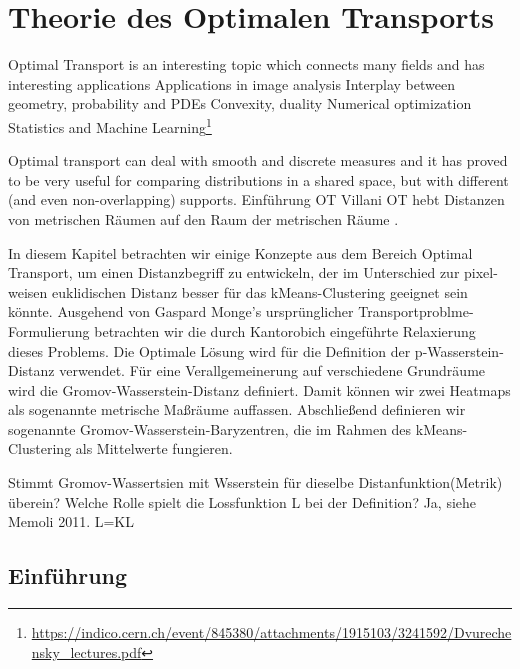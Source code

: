 \documentclass[11pt,a4paper]{article}
\numberwithin{equation}{section}
\begin{document}
	\section{Theorie des Optimalen Transports}
	
	Optimal Transport is an interesting topic which connects many fields and has
	interesting applications
	Applications in image analysis
	Interplay between geometry, probability and PDEs
	Convexity, duality
	Numerical optimization
	Statistics and Machine Learning\footnote{\url{https://indico.cern.ch/event/845380/attachments/1915103/3241592/Dvurechensky_lectures.pdf}}
	
	Optimal transport can deal with smooth and discrete measures and it has proved to be very useful
	for comparing distributions in a shared space, but with different (and even non-overlapping) supports\cite{vayer2020fused}.
	Einführung OT Villani%
	OT hebt Distanzen von metrischen Räumen auf den Raum der metrischen Räume \cite{memoli2011gromov}.
	
	In diesem Kapitel betrachten wir einige Konzepte aus dem Bereich Optimal Transport, um einen Distanzbegriff zu entwickeln, der im Unterschied zur pixel-weisen euklidischen Distanz besser für das kMeans-Clustering geeignet sein könnte.
	Ausgehend von Gaspard Monge's ursprünglicher Transportproblme-Formulierung betrachten wir die durch Kantorobich eingeführte Relaxierung dieses Problems.
	Die Optimale Lösung wird für die Definition der p-Wasserstein-Distanz verwendet.
	Für eine Verallgemeinerung auf verschiedene Grundräume wird die Gromov-Wasserstein-Distanz definiert. Damit können wir zwei Heatmaps als sogenannte metrische Maßräume auffassen.
	Abschließend definieren wir sogenannte Gromov-Wasserstein-Baryzentren, die im Rahmen des kMeans-Clustering als Mittelwerte fungieren.
	
	Stimmt Gromov-Wassertsien mit Wsserstein für dieselbe Distanfunktion(Metrik) überein? Welche Rolle spielt die Lossfunktion L bei der Definition? Ja, siehe Memoli 2011.
	L=KL
	\subsection{Einführung}
\end{document}

